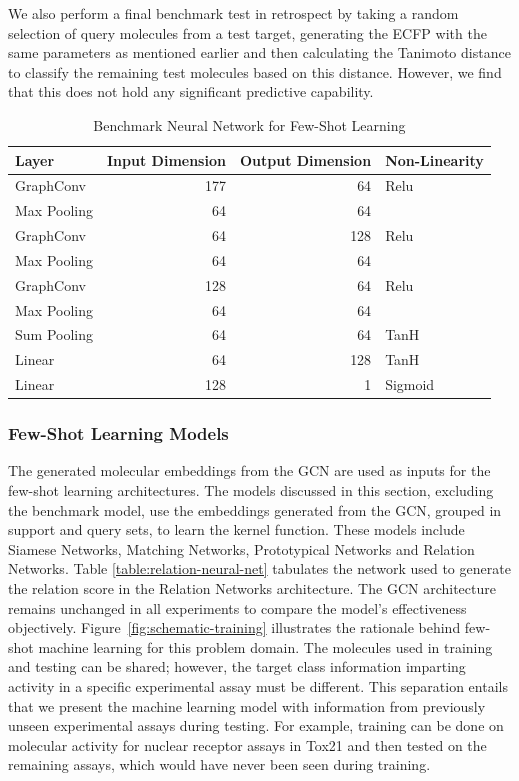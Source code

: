 \documentclass[journal=jcisd8,manuscript=article]{achemso} %
\begin{document}
We also perform a final benchmark test in retrospect by taking a random selection of query molecules from a test target, generating the ECFP with the same parameters as mentioned earlier and then calculating the Tanimoto distance to classify the remaining test molecules based on this distance. However, we find that this does not hold any significant predictive capability. 

\begin{table}
    \centering
    \begin{tabular}{@{}lrrl@{}}
    \hline
    \textbf{Layer} & \textbf{Input Dimension} & \textbf{Output Dimension} & \textbf{Non-Linearity} \\
    \hline
    GraphConv   & 177   & 64    & Relu \\
    Max Pooling & 64    & 64    &  \\
    GraphConv   & 64    & 128   & Relu \\
    Max Pooling & 64    & 64    &  \\
    GraphConv   & 128   & 64    & Relu \\
    Max Pooling & 64    & 64    &  \\
    Sum Pooling & 64    & 64    & TanH \\
    Linear      & 64    & 128   & TanH \\
    Linear      & 128   & 1     & Sigmoid \\
    \hline
    \end{tabular}
    \caption{Benchmark Neural Network for Few-Shot Learning}
    \label{table:benchmarkArchi}
\end{table}

\subsubsection{Few-Shot Learning Models}

The generated molecular embeddings from the GCN are used as inputs for the few-shot learning architectures. The models discussed in this section, excluding the benchmark model, use the embeddings generated from the GCN, grouped in support and query sets, to learn the kernel function. These models include Siamese Networks, Matching Networks, Prototypical Networks and Relation Networks. Table \ref{table:relation-neural-net} tabulates the network used to generate the relation score in the Relation Networks architecture. The GCN architecture remains unchanged in all experiments to compare the model's effectiveness objectively. Figure~\ref{fig:schematic-training} illustrates the rationale behind few-shot machine learning for this problem domain. The molecules used in training and testing can be shared; however, the target class information imparting activity in a specific experimental assay must be different. This separation entails that we present the machine learning model with information from previously unseen experimental assays during testing. For example, training can be done on molecular activity for nuclear receptor assays in Tox21 and then tested on the remaining assays, which would have never been seen during training.
\end{document}
